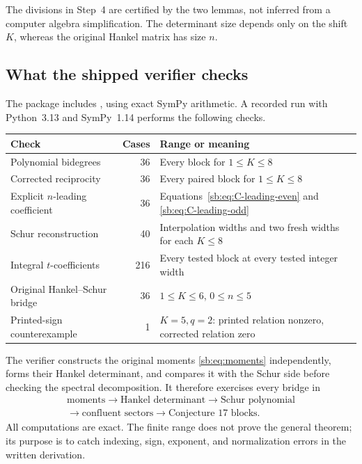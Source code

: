 \documentclass[11pt]{article}
\theoremstyle{definition}
\theoremstyle{remark}
\theoremstyle{definition}
\theoremstyle{plain}
\numberwithin{equation}{section}
\begin{document}
The divisions in Step~4 are certified by the two lemmas, not inferred from a
computer algebra simplification.  The determinant size depends only on the
shift $K$, whereas the original Hankel matrix has size $n$.

\subsection{What the shipped verifier checks}
The package includes , using exact SymPy arithmetic.  A
recorded run with Python~3.13 and SymPy~1.14 performs the following checks.
\begin{center}
\small
\begin{tabularx}{\textwidth}{@{}XrX@{}}
\toprule
Check & Cases & Range or meaning\\
\midrule
Polynomial bidegrees & 36 & Every block for $1\le K\le8$\\
Corrected reciprocity & 36 & Every paired block for $1\le K\le8$\\
Explicit $n$-leading coefficient & 36 & Equations~\eqref{sb:eq:C-leading-even} and \eqref{sb:eq:C-leading-odd}\\
Schur reconstruction & 40 & Interpolation widths and two fresh widths for each $K\le8$\\
Integral $t$-coefficients & 216 & Every tested block at every tested integer width\\
Original Hankel--Schur bridge & 36 & $1\le K\le6$, $0\le n\le5$\\
Printed-sign counterexample & 1 & $K=5,q=2$: printed relation nonzero, corrected relation zero\\
\bottomrule
\end{tabularx}
\end{center}
The verifier constructs the original moments \eqref{sb:eq:moments} independently,
forms their Hankel determinant, and compares it with the Schur side before
checking the spectral decomposition.  It therefore exercises every bridge in
\[
 \begin{gathered}
 \text{moments}\longrightarrow\text{Hankel determinant}
 \longrightarrow\text{Schur polynomial}\\
 \longrightarrow\text{confluent sectors}
 \longrightarrow\text{Conjecture 17 blocks}.
 \end{gathered}
\]
All computations are exact.  The finite range does not prove the general
theorem; its purpose is to catch indexing, sign, exponent, and normalization
errors in the written derivation.
\end{document}
